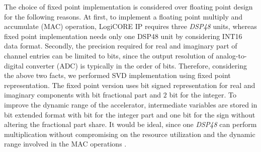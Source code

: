 \documentclass[conference,letterpaper,10pt]{./../../IEEE/IEEEtran}
\begin{document}
The choice of fixed point implementation is considered over floating point design for the following reasons. At first, to implement a floating point multiply and accumulate (MAC) operation, LogiCORE IP requires three \textit{DSP48} units, whereas fixed point implementation needs only one DSP48 unit by considering INT16 data format. Secondly, the precision required for real and imaginary part of channel entries can be limited to  bits, since the output resolution of analog-to-digital converter (ADC) is typically in the order of  bits. Therefore, considering the above two facts, we performed SVD implementation using fixed point representation. The fixed point version uses  bit signed representation for real and imaginary components with  bit fractional part and $2$ bit for the integer. To improve the dynamic range of the accelerator, intermediate variables are stored in  bit extended format with  bit for the integer part and one bit for the sign without altering the fractional part share. It would be ideal, since one \textit{DSP48} can perform  multiplication without compromising on the resource utilization and the dynamic range involved in the MAC operations \cite{zynq}. 
\end{document}
